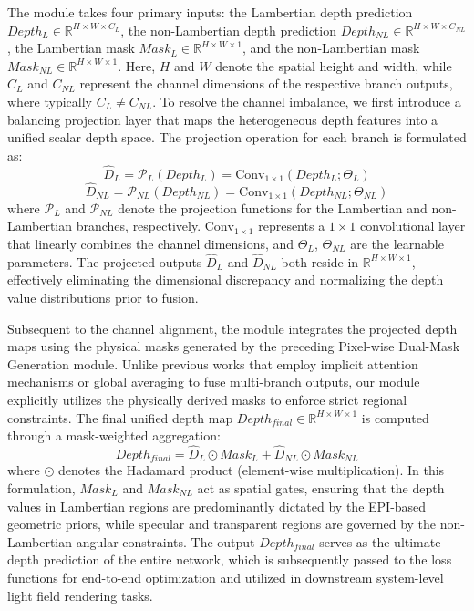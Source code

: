 The module takes four primary inputs: the Lambertian depth prediction $Depth_L \in \mathbb{R}^{H \times W \times C_L}$, the non-Lambertian depth prediction $Depth_{NL} \in \mathbb{R}^{H \times W \times C_{NL}}$, the Lambertian mask $Mask_L \in \mathbb{R}^{H \times W \times 1}$, and the non-Lambertian mask $Mask_{NL} \in \mathbb{R}^{H \times W \times 1}$. Here, $H$ and $W$ denote the spatial height and width, while $C_L$ and $C_{NL}$ represent the channel dimensions of the respective branch outputs, where typically $C_L \neq C_{NL}$. To resolve the channel imbalance, we first introduce a balancing projection layer that maps the heterogeneous depth features into a unified scalar depth space. The projection operation for each branch is formulated as:
\begin{equation}
\label{eq:eq22}
\hat{D}_L = \mathcal{P}_L(Depth_L) = \text{Conv}_{1 \times 1}(Depth_L; \Theta_L)
\end{equation}
\begin{equation}
\label{eq:eq23}
\hat{D}_{NL} = \mathcal{P}_{NL}(Depth_{NL}) = \text{Conv}_{1 \times 1}(Depth_{NL}; \Theta_{NL})
\end{equation}
where $\mathcal{P}_L$ and $\mathcal{P}_{NL}$ denote the projection functions for the Lambertian and non-Lambertian branches, respectively. $\text{Conv}_{1 \times 1}$ represents a $1 \times 1$ convolutional layer that linearly combines the channel dimensions, and $\Theta_L$, $\Theta_{NL}$ are the learnable parameters. The projected outputs $\hat{D}_L$ and $\hat{D}_{NL}$ both reside in $\mathbb{R}^{H \times W \times 1}$, effectively eliminating the dimensional discrepancy and normalizing the depth value distributions prior to fusion.

Subsequent to the channel alignment, the module integrates the projected depth maps using the physical masks generated by the preceding Pixel-wise Dual-Mask Generation module. Unlike previous works that employ implicit attention mechanisms or global averaging to fuse multi-branch outputs, our module explicitly utilizes the physically derived masks to enforce strict regional constraints. The final unified depth map $Depth_{final} \in \mathbb{R}^{H \times W \times 1}$ is computed through a mask-weighted aggregation:
\begin{equation}
\label{eq:eq24}
Depth_{final} = \hat{D}_L \odot Mask_L + \hat{D}_{NL} \odot Mask_{NL}
\end{equation}
where $\odot$ denotes the Hadamard product (element-wise multiplication). In this formulation, $Mask_L$ and $Mask_{NL}$ act as spatial gates, ensuring that the depth values in Lambertian regions are predominantly dictated by the EPI-based geometric priors, while specular and transparent regions are governed by the non-Lambertian angular constraints. The output $Depth_{final}$ serves as the ultimate depth prediction of the entire network, which is subsequently passed to the loss functions for end-to-end optimization and utilized in downstream system-level light field rendering tasks.


